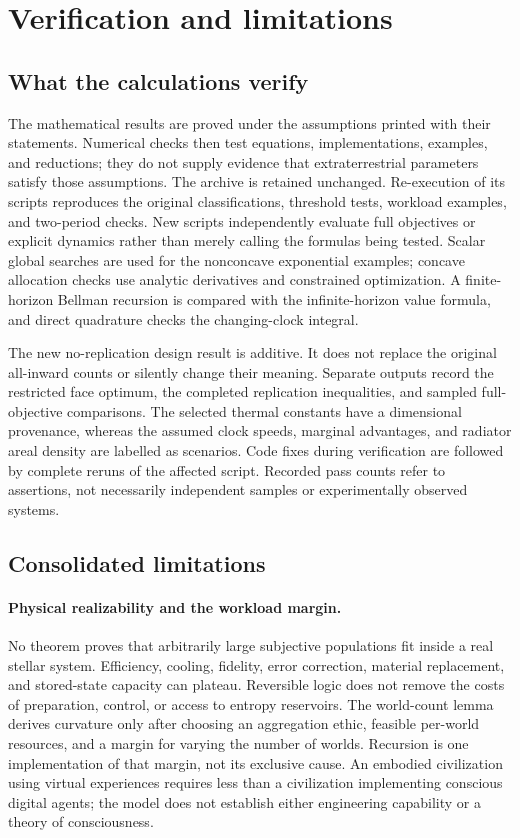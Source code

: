 \section{Verification and limitations}
\label{sec:verification}
\subsection{What the calculations verify}
The mathematical results are proved under the assumptions printed with
their statements. Numerical checks then test equations, implementations,
examples, and reductions; they do not supply evidence that extraterrestrial
parameters satisfy those assumptions. The archive is retained unchanged.
Re-execution of its scripts reproduces the original classifications,
threshold tests, workload examples, and two-period checks. New scripts
independently evaluate full objectives or explicit dynamics rather than
merely calling the formulas being tested. Scalar global searches are used
for the nonconcave exponential examples; concave allocation checks use
analytic derivatives and constrained optimization. A finite-horizon
Bellman recursion is compared with the infinite-horizon value formula,
and direct quadrature checks the changing-clock integral.

The new no-replication design result is additive. It does not replace the
original all-inward counts or silently change their meaning. Separate
outputs record the restricted face optimum, the completed replication
inequalities, and sampled full-objective comparisons. The selected
thermal constants have a dimensional provenance, whereas the assumed
clock speeds, marginal advantages, and radiator areal density are labelled
as scenarios. Code fixes during verification are followed by complete
reruns of the affected script. Recorded pass counts refer to assertions,
not necessarily independent samples or experimentally observed systems.

\subsection{Consolidated limitations}
\label{sec:limitations}
\paragraph{Physical realizability and the workload margin.}
No theorem proves that arbitrarily large subjective populations fit inside
a real stellar system. Efficiency, cooling, fidelity, error correction,
material replacement, and stored-state capacity can plateau. Reversible
logic does not remove the costs of preparation, control, or access to
entropy reservoirs. The world-count lemma derives curvature only after
choosing an aggregation ethic, feasible per-world resources, and a margin
for varying the number of worlds. Recursion is one implementation of that
margin, not its exclusive cause. An embodied civilization using virtual
experiences requires less than a civilization implementing conscious
digital agents; the model does not establish either engineering capability
or a theory of consciousness.

